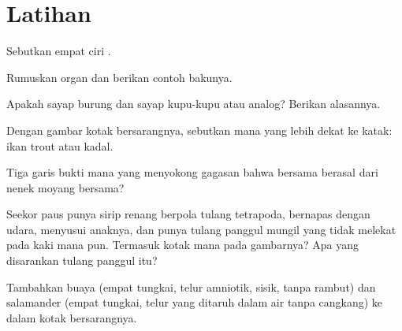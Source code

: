 \section{Latihan}

\begin{exercise}[$\star$]\label{exo:g10:common-ancestry:1}
Sebutkan empat ciri  .
\end{exercise}

\begin{exercise}[$\star$]\label{exo:g10:common-ancestry:2}
Rumuskan organ  dan berikan contoh bakunya.
\end{exercise}

\begin{exercise}[$\star$]\label{exo:g10:common-ancestry:3}
Apakah sayap burung dan sayap kupu-kupu  atau analog? Berikan
alasannya.
\end{exercise}

\begin{exercise}[$\star$]\label{exo:g10:common-ancestry:4}
Dengan gambar kotak bersarangnya, sebutkan mana yang lebih dekat ke
katak: ikan trout atau kadal.
\end{exercise}

\begin{exercise}[$\star$]\label{exo:g10:common-ancestry:5}
Tiga garis bukti mana yang menyokong gagasan bahwa  bersama
berasal dari nenek moyang bersama?
\end{exercise}

\begin{exercise}[$\star\star$]\label{exo:g10:common-ancestry:6}
Seekor paus punya sirip renang berpola tulang tetrapoda, bernapas
dengan udara, menyusui anaknya, dan punya tulang panggul mungil yang
tidak melekat pada kaki mana pun. Termasuk kotak mana pada gambarnya?
Apa yang disarankan tulang panggul itu?
\end{exercise}

\begin{exercise}[$\star\star$]\label{exo:g10:common-ancestry:7}
Tambahkan buaya (empat tungkai, telur amniotik, sisik, tanpa rambut)
dan salamander (empat tungkai, telur yang ditaruh dalam air tanpa
cangkang) ke dalam kotak bersarangnya.
\end{exercise}

